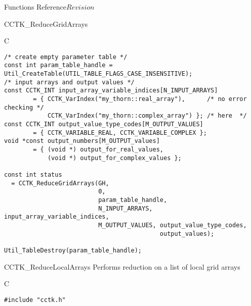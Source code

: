 \begin{cactuspart}{ Functions Reference}{}{$Revision$}
\begin{FunctionDescription}{CCTK\_ReduceGridArrays}
\begin{ExampleSection}
\begin{Example}{C}
\begin{verbatim}
/* create empty parameter table */
const int param_table_handle = Util_CreateTable(UTIL_TABLE_FLAGS_CASE_INSENSITIVE);
/* input arrays and output values */
const CCTK_INT input_array_variable_indices[N_INPUT_ARRAYS]
        = { CCTK_VarIndex("my_thorn::real_array"),      /* no error checking */
            CCTK_VarIndex("my_thorn::complex_array") }; /* here  */
const CCTK_INT output_value_type_codes[M_OUTPUT_VALUES]
        = { CCTK_VARIABLE_REAL, CCTK_VARIABLE_COMPLEX };
void *const output_numbers[M_OUTPUT_values]
        = { (void *) output_for_real_values,
            (void *) output_for_complex_values };

const int status
  = CCTK_ReduceGridArrays(GH,
                          0,
                          param_table_handle,
                          N_INPUT_ARRAYS, input_array_variable_indices,
                          M_OUTPUT_VALUES, output_value_type_codes,
                                           output_values);

Util_TableDestroy(param_table_handle);
\end{verbatim}
\end{Example}
\end{ExampleSection}
\end{FunctionDescription}

\begin{FunctionDescription}{CCTK\_ReduceLocalArrays}
\label{CCTK-ReduceLocalArrays}
Performs reduction on a list of local grid arrays

\begin{SynopsisSection}
\begin{Synopsis}{C}
\begin{verbatim}
#include "cctk.h"


\end{verbatim}
\end{Synopsis}
\end{SynopsisSection}
\end{FunctionDescription}
\end{cactuspart}
